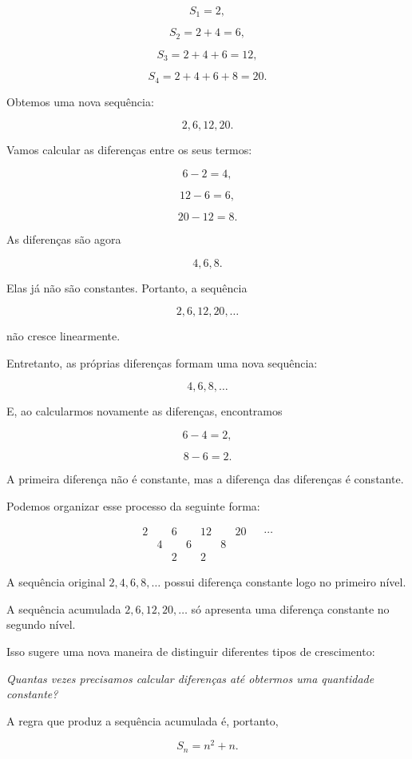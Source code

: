\documentclass[12pt,a4paper]{article}
\begin{document}
\[
S_1=2,
\]

\[
S_2=2+4=6,
\]

\[
S_3=2+4+6=12,
\]

\[
S_4=2+4+6+8=20.
\]

Obtemos uma nova sequência:

\[
2,6,12,20.
\]

Vamos calcular as diferenças entre os seus termos:

\[
6-2=4,
\]

\[
12-6=6,
\]

\[
20-12=8.
\]

As diferenças são agora

\[
4,6,8.
\]

Elas já não são constantes. Portanto, a sequência

\[
2,6,12,20,\ldots
\]

não cresce linearmente.

Entretanto, as próprias diferenças formam uma nova sequência:

\[
4,6,8,\ldots
\]

E, ao calcularmos novamente as diferenças, encontramos

\[
6-4=2,
\]

\[
8-6=2.
\]

A primeira diferença não é constante, mas a diferença das diferenças é
constante.

Podemos organizar esse processo da seguinte forma:

\[
\begin{array}{ccccccccc}
2 && 6 && 12 && 20 && \cdots\\
& 4 && 6 && 8 &&\\
&& 2 && 2 &&
\end{array}
\]

A sequência original \(2,4,6,8,\ldots\) possui diferença constante logo
no primeiro nível.

A sequência acumulada \(2,6,12,20,\ldots\) só apresenta uma diferença
constante no segundo nível.

Isso sugere uma nova maneira de distinguir diferentes tipos de
crescimento:

\begin{center}
\emph{Quantas vezes precisamos calcular diferenças até obtermos uma
quantidade constante?}
\end{center}

A regra que produz a sequência acumulada é, portanto,

\[
S_n=n^2+n.
\]
\end{document}
